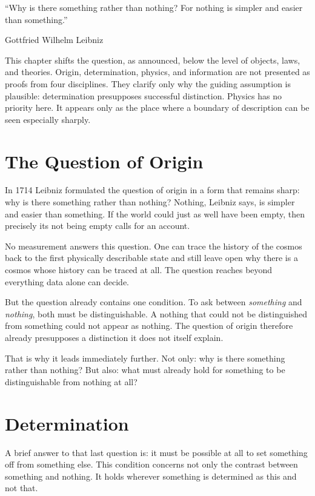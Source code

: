 \documentclass[11pt,a4paper]{book}
\begin{document}
\epigraph{``Why is there something rather than nothing? For nothing is
simpler and easier than something.''}{Gottfried Wilhelm Leibniz}

This chapter shifts the question, as announced, below the level of objects,
laws, and theories. Origin, determination, physics, and information are not
presented as proofs from four disciplines. They clarify only why the guiding
assumption is plausible: determination presupposes successful distinction.
Physics has no priority here. It appears only as the place where a boundary
of description can be seen especially sharply.

\section{The Question of Origin}

In 1714 Leibniz formulated the question of origin in a form that remains
sharp: why is there something rather than nothing? Nothing, Leibniz says,
is simpler and easier than something. If the world could just as well have
been empty, then precisely its not being empty calls for an account.

No measurement answers this question. One can trace the history of the cosmos
back to the first physically describable state and still leave open why there
is a cosmos whose history can be traced at all. The question reaches beyond
everything data alone can decide.

But the question already contains one condition. To ask between
\emph{something} and \emph{nothing}, both must be distinguishable. A nothing
that could not be distinguished from something could not appear as nothing.
The question of origin therefore already presupposes a distinction it does
not itself explain.

That is why it leads immediately further. Not only: why is there something
rather than nothing? But also: what must already hold for something to be
distinguishable from nothing at all?

\section{Determination}
\label{ch:description}

A brief answer to that last question is: it must be possible at all to set
something off from something else. This condition concerns not only the
contrast between something and nothing. It holds wherever something is
determined as this and not that.
\end{document}

